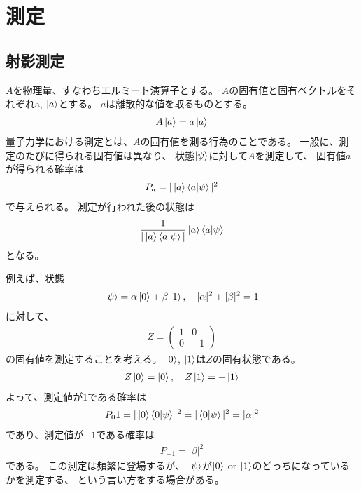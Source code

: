 \documentclass[]{ltjsarticle}
\begin{document}
\section{測定}
\subsection{射影測定}
$A$を物理量、すなわちエルミート演算子とする。
$A$の固有値と固有ベクトルをそれぞれa, $\ket{a}$とする。
$a$は離散的な値を取るものとする。
\begin{align}
    A\ket{a} = a\ket{a}
\end{align}
量子力学における測定とは、$A$の固有値を測る行為のことである。
一般に、測定のたびに得られる固有値は異なり、
状態$\ket{\psi}$に対して$A$を測定して、
固有値$a$が得られる確率は
\begin{align}
    P_a = |\ket{a}\braket{a|\psi}|^2
\end{align}
で与えられる。
測定が行われた後の状態は
\begin{align}
    \frac{1}{|\ket{a}\braket{a|\psi}|}\ket{a}\braket{a|\psi}
\end{align}
となる。

例えば、状態
\begin{align}
    \ket{\psi} 
    =
    \alpha\ket{0}   
    +
    \beta\ket{1}, \quad 
    |\alpha|^2 + |\beta|^2 = 1
\end{align}
に対して、
\begin{align}
    Z =
    \begin{pmatrix}
        1 & 0 \\
        0 & -1
    \end{pmatrix}
\end{align}
の固有値を測定することを考える。
$\ket{0}$, $\ket{1}$は$Z$の固有状態である。
\begin{align}
    Z \ket{0} = \ket{0}, \quad 
    Z \ket{1} = -\ket{1} 
\end{align}
よって、測定値が1である確率は
\begin{align}
    P_01
    = 
    |\ket{0}\braket{0|\psi}|^2
    =
    |\braket{0|\psi}|^2
    =
    |\alpha|^2
\end{align}
であり、測定値が$-1$である確率は
\begin{align}
    P_{-1} = |\beta|^2
\end{align}
である。
この測定は頻繁に登場するが、
$\ket{\psi}$が$\ket{0}$ or $\ket{1}$のどっちになっているかを測定する、
という言い方をする場合がある。
\end{document}
